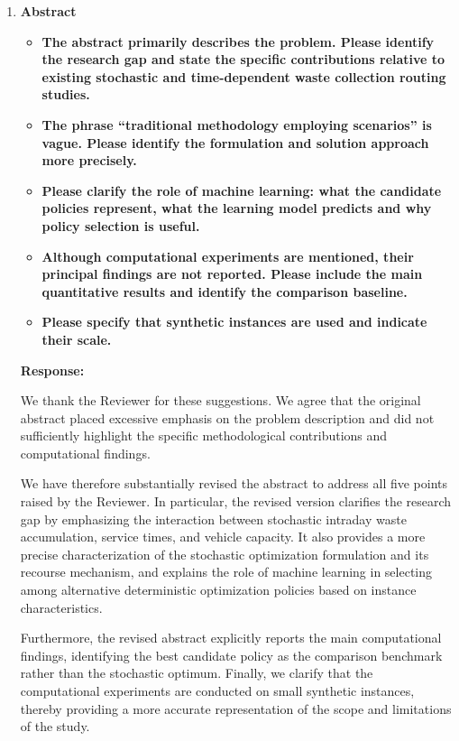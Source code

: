 \documentclass[11pt]{article}
\begin{document}
\begin{enumerate}
\item \textbf{Abstract}
\begin{itemize}
\item \textbf{The abstract primarily describes the problem. Please identify the research gap and state
the specific contributions relative to existing stochastic and time-dependent waste collection routing studies.}
\item \textbf{The phrase “traditional methodology employing scenarios” is vague. Please identify the
formulation and solution approach more precisely.}
\item \textbf{Please clarify the role of machine learning: what the candidate policies represent, what
the learning model predicts and why policy selection is useful.}
\item \textbf{Although computational experiments are mentioned, their principal findings are not
reported. Please include the main quantitative results and identify the comparison baseline.}
\item \textbf{Please specify that synthetic instances are used and indicate their scale.}
\end{itemize}
\vspace{1mm}

\noindent\textbf{Response:}


We thank the Reviewer for these suggestions. We agree that the original abstract placed excessive emphasis on the problem description and did not sufficiently highlight the specific methodological contributions and computational findings.

We have therefore substantially revised the abstract to address all five points raised by the Reviewer. In particular, the revised version clarifies the research gap by emphasizing the interaction between stochastic intraday waste accumulation, service times, and vehicle capacity. It also provides a more precise characterization of the stochastic optimization formulation and its recourse mechanism, and explains the role of machine learning in selecting among alternative deterministic optimization policies based on instance characteristics.

Furthermore, the revised abstract explicitly reports the main computational findings, identifying the best candidate policy as the comparison benchmark rather than the stochastic optimum. Finally, we clarify that the computational experiments are conducted on small synthetic instances, thereby providing a more accurate representation of the scope and limitations of the study.




\end{enumerate}
\end{document}
